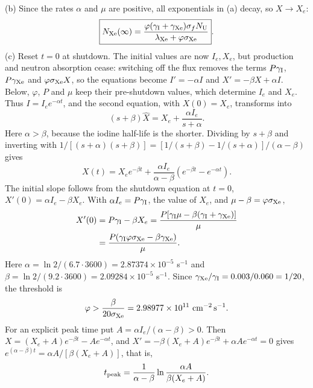 (b) Since the rates $\alpha$ and $\mu$ are positive, all
exponentials in (a) decay, so $X\to X_e$:
\[
\boxed{N_{\rm Xe}(\infty)=
\frac{\varphi(\gamma_{\rm I}+\gamma_{\rm Xe})\sigma_fN_{\rm U}}
{\lambda_{\rm Xe}+\varphi\sigma_{\rm Xe}}}.
\]
(c) Reset $t=0$ at shutdown. The initial values are now
$I_e,X_e$, but production and neutron absorption cease:
switching off the flux removes the terms $P\gamma_{\rm I}$,
$P\gamma_{\rm Xe}$ and $\varphi\sigma_{\rm Xe}X$, so the
equations become $I'=-\alpha I$ and $X'=-\beta X+\alpha I$.
Below, $\varphi$, $P$ and $\mu$ keep their pre-shutdown values,
which determine $I_e$ and $X_e$.
Thus $I=I_e e^{-\alpha t}$, and the second equation, with
$X(0)=X_e$, transforms into
\[
(s+\beta)\widehat X=X_e+\frac{\alpha I_e}{s+\alpha}.
\]
Here $\alpha>\beta$, because the iodine half-life is the
shorter. Dividing by $s+\beta$ and inverting with
$1/[(s+\alpha)(s+\beta)]=[1/(s+\beta)-1/(s+\alpha)]/(\alpha-\beta)$
gives
\[
\boxed{X(t)=X_e e^{-\beta t}
+\frac{\alpha I_e}{\alpha-\beta}
(e^{-\beta t}-e^{-\alpha t})}.
\]
The initial slope follows from the shutdown equation at $t=0$,
$X'(0)=\alpha I_e-\beta X_e$. With $\alpha I_e=P\gamma_{\rm I}$,
the value of $X_e$, and $\mu-\beta=\varphi\sigma_{\rm Xe}$,
\begin{align*}
X'(0)&=P\gamma_{\rm I}-\beta X_e
=\frac{P[\gamma_{\rm I}\mu-\beta(\gamma_{\rm I}+\gamma_{\rm Xe})]}
{\mu}\\
&=\frac{P(\gamma_{\rm I}\varphi\sigma_{\rm Xe}
-\beta\gamma_{\rm Xe})}{\mu}.
\end{align*}
Here $\alpha=\ln2/(6.7\cdot3600)=2.87374\times10^{-5}$ s$^{-1}$
and $\beta=\ln2/(9.2\cdot3600)=2.09284\times10^{-5}$ s$^{-1}$.
Since $\gamma_{\rm Xe}/\gamma_{\rm I}=0.003/0.060=1/20$,
the threshold is
\[
\varphi>\frac{\beta}{20\sigma_{\rm Xe}}
=2.98977\times10^{11}\ \mathrm{cm}^{-2}\,\mathrm{s}^{-1}.
\]
For an explicit peak time put $A=\alpha I_e/(\alpha-\beta)>0$.
Then $X=(X_e+A)e^{-\beta t}-Ae^{-\alpha t}$, and
$X'=-\beta(X_e+A)e^{-\beta t}+\alpha Ae^{-\alpha t}=0$ gives
$e^{(\alpha-\beta)t}=\alpha A/[\beta(X_e+A)]$, that is,
\[
t_{\rm peak}=\frac1{\alpha-\beta}
\ln\frac{\alpha A}{\beta(X_e+A)}.
\]
